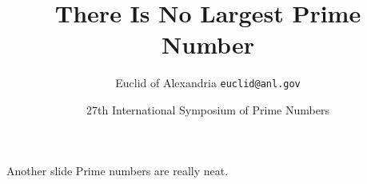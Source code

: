 \documentclass[aspectratio=149]{beamer}
\title{There Is No Largest Prime Number}
\date[ISPN ’80]{27th International Symposium of Prime Numbers}
\author[Euclid]{Euclid of Alexandria \texttt{euclid@anl.gov}}
\begin{document}
\begin{frame}
\titlepage
\end{frame}

\begin{frame}{Another slide}
  Prime numbers are really neat.
\end{frame}
\end{document}
